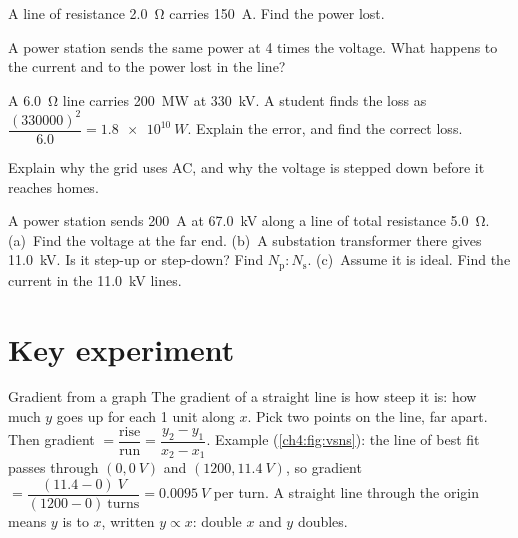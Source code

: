 \begin{quickcheck}
  \item A line of resistance \qty{2.0}{\ohm} carries \qty{150}{A}. Find the power lost.
  \item A power station sends the same power at 4 times the voltage. What happens to the
        current and to the power lost in the line?
  \item A \qty{6.0}{\ohm} line carries \qty{200}{MW} at \qty{330}{kV}. A student finds
        the loss as $\dfrac{(\num{330000})^2}{6.0} = \qty{1.8e10}{W}$. Explain the error,
        and find the correct loss.\label{ch4:qc:v2r}
  \item Explain why the grid uses AC, and why the voltage is stepped down before it
        reaches homes.
  \item A power station sends \qty{200}{A} at \qty{67.0}{kV} along a line of total
        resistance \qty{5.0}{\ohm}. (a)~Find the voltage at the far end. (b)~A substation
        transformer there gives \qty{11.0}{kV}. Is it step-up or step-down? Find
        $N_\mathrm{p} : N_\mathrm{s}$. (c)~Assume it is ideal. Find the current in the
        \qty{11.0}{kV} lines.\label{ch4:qc:substation}
\end{quickcheck}

\section{Key experiment}\label{ch4:sec:experiments}

\begin{toolkit}{Gradient from a graph}
The gradient of a straight line is how steep it is: how much $y$ goes up for each 1 unit
along $x$. Pick two points on the line, far apart. Then
gradient $= \dfrac{\text{rise}}{\text{run}} = \dfrac{y_2 - y_1}{x_2 - x_1}$. Example
(\cref{ch4:fig:vsns}): the line of best fit passes through $(0, \qty{0}{V})$ and
$(1200, \qty{11.4}{V})$, so gradient
$= \dfrac{(11.4 - 0)\ \si{V}}{(1200 - 0)\ \text{turns}} = \qty{0.0095}{V}$ per turn.
A straight line through the origin means $y$ is  to $x$,
written $y \propto x$: double $x$ and $y$ doubles.
\end{toolkit}

